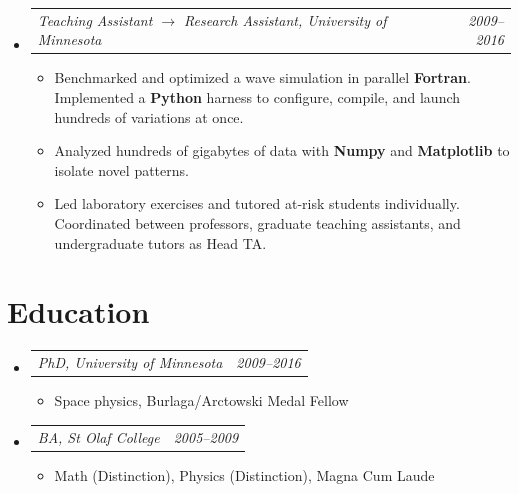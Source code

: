 \documentclass[12pt,letterpaper]{article}
\makeatletter
\newcommand{\headerpair}[2]{
    \begin{tabular*}{\linewidth}{l@{ \extracolsep{\fill} }r} {\large\emph{#1}} & {\large\emph{#2}}
    \end{tabular*}
}
\newcommand{\headerrow}[3]{\headerpair{#1, #2}{#3}}
\newcommand{\YearRange}[2]{#1--#2}
\newcommand{\ResumeSection}[1]{\section*{{\color{MidnightBlue}#1 \sout{\hfill}}}}
\makeatother
\begin{document}
\begin{itemize}[leftmargin=\parindent]
    \item[]
        \headerrow
            {Teaching Assistant $\to$ Research Assistant}
            {University of Minnesota}
            {\YearRange{2009}{2016}}
        \begin{itemize}[leftmargin=\parindent]
            \item Benchmarked and optimized a wave simulation in parallel \textbf{Fortran}. Implemented a \textbf{Python} harness to configure, compile, and launch hundreds of variations at once.
            \item Analyzed hundreds of gigabytes of data with \textbf{Numpy} and \textbf{Matplotlib} to isolate novel patterns.
            \item Led laboratory exercises and tutored at-risk students individually. Coordinated between professors, graduate teaching assistants, and undergraduate tutors as Head TA.
        \end{itemize}

\end{itemize}


\ResumeSection{Education}

\begin{itemize}[leftmargin=\parindent]
    \parskip=0.1em
    \itemsep=1.2em

    \item[]
        \headerrow
            {PhD}
            {University of Minnesota}
            {\YearRange{2009}{2016}}
        \begin{itemize}[leftmargin=\parindent]
            \item Space physics, Burlaga/Arctowski Medal Fellow
        \end{itemize}
    \item[]
        \headerrow
            {BA}
            {St Olaf College}
            {\YearRange{2005}{2009}}
        \begin{itemize}[leftmargin=\parindent]
            \item Math (Distinction), Physics (Distinction),
                 Magna Cum Laude
        \end{itemize}
\end{itemize}

\end{document}

